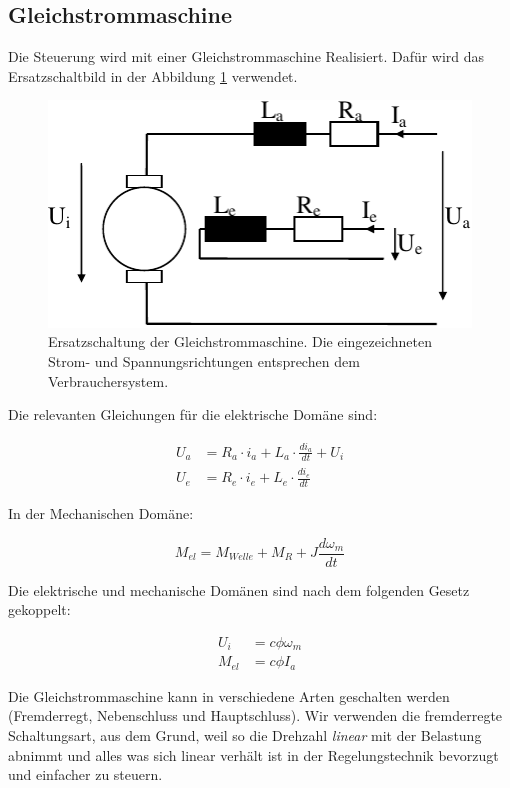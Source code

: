 \subsection{Gleichstrommaschine}

Die Steuerung wird mit  einer Gleichstrommaschine Realisiert. Daf\"ur wird das
Ersatzschaltbild   in   der  Abbildung  \ref{fig:dc-motor-ersatz}   verwendet.

\begin{figure}[H]
    \centering
    \includegraphics[width=\imagewidth]{images/dc_motor_ersatz}
    \caption{Ersatzschaltung der Gleichstrommaschine. Die eingezeichneten Strom- und Spannungsrichtungen entsprechen dem Verbrauchersystem.}
    \label{fig:dc-motor-ersatz}
\end{figure}

Die relevanten Gleichungen f\"ur die elektrische Dom\"ane sind:

\begin{align}
    U_a &= R_a \cdot i_a + L_a \cdot \frac{di_a}{dt} + U_i \\
    U_e &= R_e \cdot i_e + L_e \cdot \frac{di_e}{dt}
\end{align}

In der Mechanischen Dom\"ane:

\begin{equation}
    M_{el} = M_{Welle} + M_R + J\frac{d\omega_m}{dt}
\end{equation}

Die  elektrische  und  mechanische  Dom\"anen sind nach dem  folgenden  Gesetz
gekoppelt:

\begin{align}
    U_i    &= c\phi\omega_m \\
    M_{el} &= c\phi I_a
\end{align}

Die   Gleichstrommaschine   kann  in  verschiedene  Arten  geschalten   werden
(Fremderregt, Nebenschluss und Hauptschluss). Wir verwenden  die  fremderregte
Schaltungsart,  aus dem Grund, weil so die Drehzahl  \textit{linear}  mit  der
Belastung   abnimmt   und  alles  was  sich  linear  verh\"alt  ist   in   der
Regelungstechnik bevorzugt und einfacher zu steuern.

